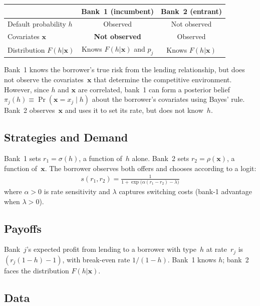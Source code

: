 \documentclass[12pt]{article}
\theoremstyle{plain}
\theoremstyle{plain}
\theoremstyle{definition}
\theoremstyle{remark}
\begin{document}
\begin{center}
\renewcommand{\arraystretch}{1.3}
\begin{tabular}{lcc}
\toprule
& \textbf{Bank~1 (incumbent)} & \textbf{Bank~2 (entrant)} \\
\midrule
Default probability $h$ & Observed & Not observed \\
Covariates $\mathbf{x}$ & \textbf{Not observed} & Observed \\
Distribution $F(h|\mathbf{x})$ & Knows $F(h|\mathbf{x})$ and $p_j$ & Knows $F(h|\mathbf{x})$ \\
\bottomrule
\end{tabular}
\end{center}
Bank~1 knows the borrower's true risk from the lending relationship, but does not observe the covariates~$\mathbf{x}$ that determine the competitive environment.  However, since $h$ and $\mathbf{x}$ are correlated, bank~1 can form a posterior belief $\pi_j(h) \equiv \Pr(\mathbf{x} = x_j \mid h)$ about the borrower's covariates using Bayes' rule.  Bank~2 observes~$\mathbf{x}$ and uses it to set its rate, but does not know~$h$.

\subsection{Strategies and Demand}

Bank~1 sets $r_1 = \sigma(h)$, a function of~$h$ alone.  Bank~2 sets $r_2 = \rho(\mathbf{x})$, a function of~$\mathbf{x}$.  The borrower observes both offers and chooses according to a logit:
\begin{align}\label{eq:share8}
    s(r_1, r_2) = \frac{1}{1 + \exp\!\big(\alpha(r_1 - r_2) - \lambda\big)}
\end{align}
where $\alpha > 0$ is rate sensitivity and $\lambda$ captures switching costs (bank-1 advantage when $\lambda > 0$).


\subsection{Payoffs}

Bank~$j$'s expected profit from lending to a borrower with type~$h$ at rate~$r_j$ is $(r_j(1-h) - 1)$, with break-even rate $1/(1-h)$.  Bank~1 knows $h$; bank~2 faces the distribution $F(h|\mathbf{x})$.

\subsection{Data}
\end{document}
